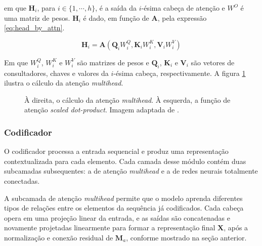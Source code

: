 em que $\boldsymbol{H}_{i}$, para $i \in \{1, \cdots, h\}$, é a saída da $i$-ésima cabeça de atenção e $W^{O}$ é uma matriz de pesos. $\boldsymbol{H}_{i}$ é dado, em função de $\boldsymbol{A}$, pela expressão \ref{eq:head_by_attn}.

\begin{equation}
    \label{eq:head_by_attn}
    \boldsymbol{H}_{i} = \boldsymbol{A}(\boldsymbol{Q}_{i}W_{i}^{Q}, \boldsymbol{K}_{i}W_{i}^{K}, \boldsymbol{V}_{i}W_{i}^{V})
\end{equation}

Em que $W_{i}^{Q}$, $W_{i}^{K}$ e $W_{i}^{V}$ são matrizes de pesos e $\boldsymbol{Q}_{i}$, $\boldsymbol{K}_{i}$ e $\boldsymbol{V}_{i}$ são vetores de consultadores, chaves e valores da $i$-ésima cabeça, respectivamente. A figura \ref{fig:multihead_attention} ilustra o cálculo da atenção \textit{multihead}.

\begin{figure}[H]
    \centering
    \caption{À direita, o cálculo da atenção \textit{multihead}. À esquerda, a função de atenção \textit{scaled dot-product}. Imagem adaptada de \cite{attention2017}.}
    \label{fig:multihead_attention}
    \begin{minipage}{0.35\textwidth}
        \centering
        
    \end{minipage}
    \begin{minipage}{0.5\textwidth}
        \centering
        
    \end{minipage}
\end{figure}

\subsubsection{Codificador}

O codificador processa a entrada sequencial e produz uma representação contextualizada para cada elemento. Cada camada desse módulo contém duas subcamadas subsequentes: a de atenção \textit{multihead} e a de redes neurais totalmente conectadas.

A subcamada de atenção \textit{multihead} permite que o modelo aprenda diferentes tipos de relações entre os elementos da sequência já codificados. Cada cabeça opera em uma projeção linear da entrada, e as saídas são concatenadas e novamente projetadas linearmente para formar a representação final $\boldsymbol{X}$, após a normalização e conexão residual de $\boldsymbol{M}_{a}$, conforme mostrado na seção anterior.

